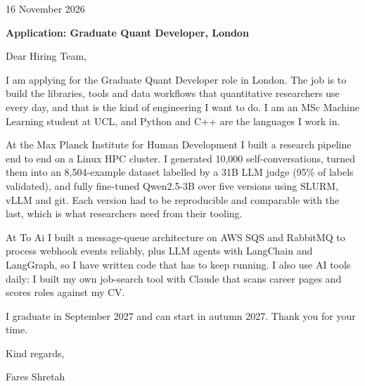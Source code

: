 \documentclass[11pt, a4paper]{article}
\begin{document}
16 November 2026

\textbf{Application: Graduate Quant Developer, London}

Dear Hiring Team,

I am applying for the Graduate Quant Developer role in London. The job is to build the libraries, tools and data workflows that quantitative researchers use every day, and that is the kind of engineering I want to do. I am an MSc Machine Learning student at UCL, and Python and C++ are the languages I work in.

At the Max Planck Institute for Human Development I built a research pipeline end to end on a Linux HPC cluster. I generated 10,000 self-conversations, turned them into an 8,504-example dataset labelled by a 31B LLM judge (95\% of labels validated), and fully fine-tuned Qwen2.5-3B over five versions using SLURM, vLLM and git. Each version had to be reproducible and comparable with the last, which is what researchers need from their tooling.

At To Ai I built a message-queue architecture on AWS SQS and RabbitMQ to process webhook events reliably, plus LLM agents with LangChain and LangGraph, so I have written code that has to keep running. I also use AI tools daily: I built my own job-search tool with Claude that scans career pages and scores roles against my CV.

I graduate in September 2027 and can start in autumn 2027. Thank you for your time.

Kind regards,

Fares Shretah
\end{document}
